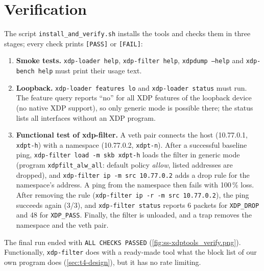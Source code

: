 \section{Verification}\label{sec:t5-verify}
The script \texttt{install\_and\_verify.sh} installs the tools and checks them in three stages; every check prints \texttt{[PASS]} or \texttt{[FAIL]}:
\begin{enumerate}
	\item \textbf{Smoke tests.} \texttt{xdp-loader help}, \texttt{xdp-filter help}, \texttt{xdpdump --help} and \texttt{xdp-bench help} must print their usage text.
	\item \textbf{Loopback.} \texttt{xdp-loader features lo} and \texttt{xdp-loader status} must run. The feature query reports \enquote{no} for all XDP features of the loopback device (no native XDP support), so only generic mode is possible there; the status lists all interfaces without an XDP program.
	\item \textbf{Functional test of xdp-filter.} A veth pair connects the host (10.77.0.1, \texttt{xdpt-h}) with a namespace (10.77.0.2, \texttt{xdpt-n}). After a successful baseline ping, \texttt{xdp-filter load -m skb xdpt-h} loads the filter in generic mode (program \texttt{xdpfilt\_alw\_all}: default policy \emph{allow}, listed addresses are dropped), and \texttt{xdp-filter ip -m src 10.77.0.2} adds a drop rule for the namespace's address. A ping from the namespace then fails with 100\,\% loss. After removing the rule (\texttt{xdp-filter ip -r -m src 10.77.0.2}), the ping succeeds again (3/3), and \texttt{xdp-filter status} reports 6 packets for \texttt{XDP\_DROP} and 48 for \texttt{XDP\_PASS}. Finally, the filter is unloaded, and a trap removes the namespace and the veth pair.
\end{enumerate}
The final run ended with \texttt{ALL CHECKS PASSED} (\cref{fig:ss-xdptools_verify.png}). Functionally, \texttt{xdp-filter} does with a ready-made tool what the block list of our own program does (\cref{sec:t4-design}), but it has no rate limiting.


